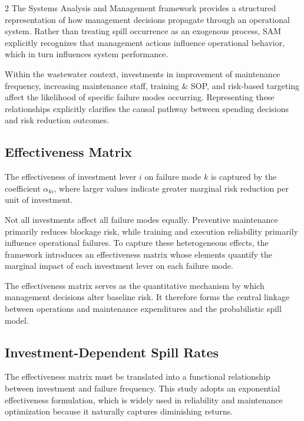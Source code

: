 \documentclass[10pt]{article}
\begin{document}
\begin{multicols}{2}
The Systems Analysis and Management framework provides a structured representation of how management decisions propagate through an operational system. Rather than treating spill occurrence as an exogenous process, SAM explicitly recognizes that management actions influence operational behavior, which in turn influences system performance.

Within the wastewater context, investments in improvement of maintenance frequency, increasing maintenance staff, training \& SOP, and risk-based targeting affect the likelihood of specific failure modes occurring. Representing these relationships explicitly clarifies the causal pathway between spending decisions and risk reduction outcomes.

\subsection{Effectiveness Matrix}

The effectiveness of investment lever $i$ on failure mode $k$ is captured
by the coefficient $\alpha_{ki}$, where larger values indicate greater
marginal risk reduction per unit of investment.

Not all investments affect all failure modes equally. Preventive maintenance primarily reduces blockage risk, while training and execution reliability primarily influence operational failures. To capture these heterogeneous effects, the framework introduces an effectiveness matrix whose elements quantify the marginal impact of each investment lever on each failure mode.

The effectiveness matrix serves as the quantitative mechanism by which management decisions alter baseline risk. It therefore forms the central linkage between operations and maintenance expenditures and the probabilistic spill model.


\subsection{Investment-Dependent Spill Rates}

The effectiveness matrix must be translated into a functional relationship between investment and failure frequency. This study adopts an exponential effectiveness formulation, which is widely used in reliability and maintenance optimization because it naturally captures diminishing returns.


\end{multicols}
\end{document}
